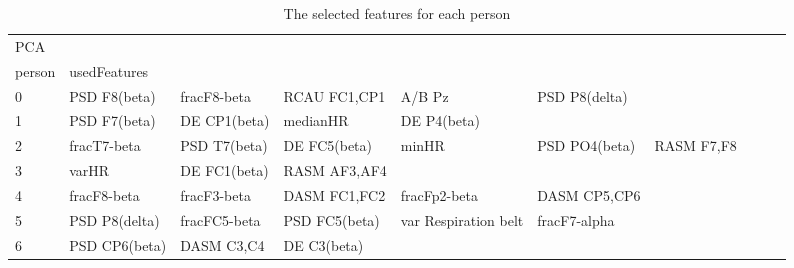 \begin{landscape}
\begin{table}[]
\centering
\caption{The selected features for each person}
\begin{tabular}{l|llllllll}
PCA      &                       &                       &                      &                         &                         &                      &                      &                       &                       &                    \\
person   & usedFeatures          &                       &                      &                         &                         &                      &                      &                       &                       &                    \\
0        & PSD F8(beta)          & fracF8-beta           & RCAU FC1,CP1         & A/B Pz                  & PSD P8(delta)           &                      &                      &                       &                       &                    \\
1        & PSD F7(beta)          & DE CP1(beta)          & medianHR             & DE P4(beta)             &                         &                      &                      &                       &                       &                    \\
2        & fracT7-beta           & PSD T7(beta)          & DE FC5(beta)         & minHR                   & PSD PO4(beta)           & RASM F7,F8           &                      &                       &                       &                    \\
3        & varHR                 & DE FC1(beta)          & RASM AF3,AF4         &                         &                         &                      &                      &                       &                       &                    \\
4        & fracF8-beta           & fracF3-beta           & DASM FC1,FC2         & fracFp2-beta            & DASM CP5,CP6            &                      &                      &                       &                       &                    \\
5        & PSD P8(delta)         & fracFC5-beta          & PSD FC5(beta)        & var Respiration belt    & fracF7-alpha            &                      &                      &                       &                       &                    \\
6        & PSD CP6(beta)         & DASM C3,C4            & DE C3(beta)          &                         &                         &                      &                      &                       &                       &                    \\

\end{tabular}
\end{table}
\end{landscape}
